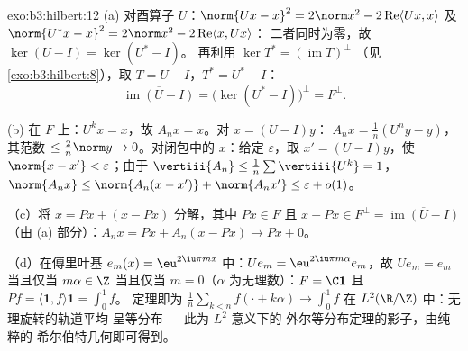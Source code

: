 \begin{solution}{exo:b3:hilbert:12}
(a) 对酉算子 $U$：$\norm{Ux - x}^2 = 2\norm x^2 -
2\operatorname{Re}\langle Ux, x\rangle$ 及 $\norm{U^*x -
x}^2 = 2\norm x^2 - 2\operatorname{Re}\langle x, Ux\rangle$：
二者同时为零，故 $\ker(U - I) = \ker(U^* - I)$。
再利用 $\ker T^* = (\operatorname{im}T)^\perp$
（见\cref{exo:b3:hilbert:8}），取 $T = U - I$，$T^* = U^* -
I$：
\[
\overline{\operatorname{im}(U - I)} = \bigl(\ker(U^* -
I)\bigr)^\perp = F^\perp .
\]

(b) 在 $F$ 上：$U^kx = x$，故 $A_nx = x$。对 $x = (U - I)y$：
$A_nx = \frac1n(U^ny - y)$，其范数 $\leq \frac2n\norm y \to
0$。对闭包中的 $x$：给定 $\varepsilon$，取 $x' =
(U - I)y$，使 $\norm{x - x'} < \varepsilon$；由于
$\vertiii{A_n} \leq \frac1n\sum\vertiii{U^k} = 1$，
$\norm{A_nx} \leq \norm{A_n(x - x')} + \norm{A_nx'} \leq
\varepsilon + o(1)$。

（c）将 $x = Px + (x - Px)$ 分解，其中 $Px \in F$ 且 $x -
Px \in F^\perp = \overline{\operatorname{im}(U - I)}$（由
(a) 部分）：$A_nx = Px + A_n(x - Px) \to Px + 0$。

（d）在傅里叶基 $e_m(x) = \eu^{2\iu\pi mx}$ 中：$Ue_m
= \eu^{2\iu\pi m\alpha}e_m$，故 $Ue_m = e_m$ 当且仅当 $m\alpha
\in \Z$ 当且仅当 $m = 0$（$\alpha$ 为无理数）：$F = \C\mathbf 1$
且 $Pf = \langle\mathbf 1, f\rangle\mathbf 1 = \int_0^1f$。
定理即为 $\frac1n\sum_{k<n}f(\cdot + k\alpha) \to
\int_0^1f$ 在 $L^2(\R/\Z)$ 中：无理旋转的轨道平均
呈等分布 --- 此为 $L^2$ 意义下的
外尔等分布定理的影子，由纯粹的
希尔伯特几何即可得到。
\end{solution}

